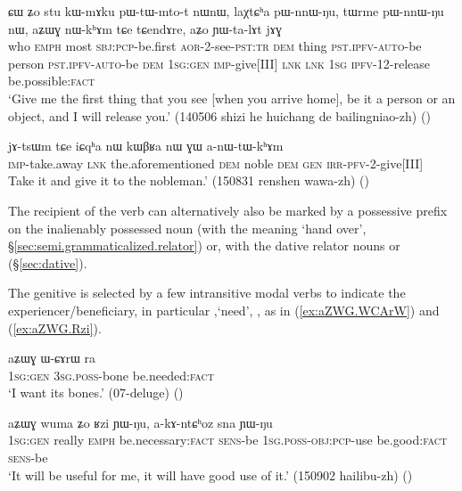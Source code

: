 \begin{exe}
\ex \label{ex:aZWG.nWkhAm}
 \gll ɕɯ ʑo stu kɯ-mɤku pɯ-tɯ-mto-t nɯnɯ, laχtɕʰa pɯ-nnɯ-ŋu, tɯrme pɯ-nnɯ-ŋu nɯ, aʑɯɣ nɯ-kʰɤm tɕe tɕendɤre, aʑo ɲɯ-ta-lɤt jɤɣ \\
 who \textsc{emph} most \textsc{sbj}:\textsc{pcp}-be.first \textsc{aor}-2-see-\textsc{pst}:\textsc{tr} \textsc{dem}  thing \textsc{pst}.\textsc{ipfv}-\textsc{auto}-be   person \textsc{pst}.\textsc{ipfv}-\textsc{auto}-be \textsc{dem} \textsc{1sg}:\textsc{gen} \textsc{imp}-give[III] \textsc{lnk} \textsc{lnk} \textsc{1sg} \textsc{ipfv}-1\fl{}2-release be.possible:\textsc{fact} \\
 \glt `Give me the first thing that you see [when you arrive home], be it a person or an object, and I will release you.' (140506 shizi he huichang de bailingniao-zh)
()
\end{exe}

\begin{exe}
\ex \label{ex:GW.anWtWkhAm}
 \gll jɤ-tsɯm tɕe iɕqʰa nɯ kɯβʁa nɯ ɣɯ a-nɯ-tɯ-kʰɤm \\
 \textsc{imp}-take.away \textsc{lnk} the.aforementioned \textsc{dem} noble \textsc{dem} \textsc{gen} \textsc{irr}-\textsc{pfv}-2-give[III] \\
 \glt  Take it and give it to the nobleman.' (150831 renshen wawa-zh) ()
\end{exe}
 
The recipient of the verb   can alternatively also be marked by a possessive prefix on the inalienably possessed noun  (with the meaning `hand over', §\ref{sec:semi.grammaticalized.relator}) or, with the dative relator nouns  or  (§\ref{sec:dative}).

The genitive is selected by a few intransitive modal verbs to indicate the experiencer/beneficiary, in particular  ,`need', , as in (\ref{ex:aZWG.WCArW}) and (\ref{ex:aZWG.Rzi}).

\begin{exe}
\ex \label{ex:aZWG.WCArW}
 \gll aʑɯɣ ɯ-ɕɤrɯ ra \\
 \textsc{1sg}:\textsc{gen} \textsc{3sg}.\textsc{poss}-bone be.needed:\textsc{fact} \\
\glt `I want its bones.' (07-deluge) ()
\end{exe}

\begin{exe}
\ex \label{ex:aZWG.Rzi}
 \gll aʑɯɣ wuma ʑo ʁzi ɲɯ-ŋu, a-kɤ-ntɕʰoz sna ɲɯ-ŋu \\
  \textsc{1sg}:\textsc{gen} really \textsc{emph} be.necessary:\textsc{fact} \textsc{sens}-be \textsc{1sg}.\textsc{poss}-\textsc{obj}:\textsc{pcp}-use be.good:\textsc{fact}  \textsc{sens}-be \\
  \glt `It will be useful for me, it will have good use of it.'  (150902 hailibu-zh) ()
\end{exe}

